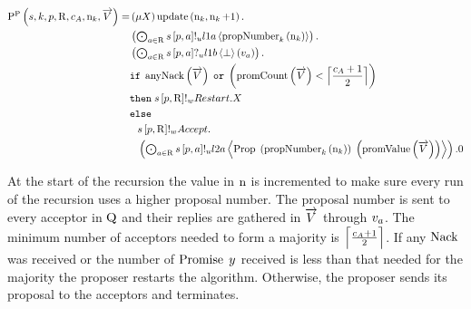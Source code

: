 \begin{align*}
\PpOne{
    \SessionChannel,
    \ProcessIndexK,
    \ProposerRole,
    \QRoles,
    \AcceptorCount,
    \NumberRegister_{\ProcessIndexK},
    \VectorV
} =
&
    \Mu{\RecursionVariable}
    \update{\NumberRegister_{\ProcessIndexK}}{\NumberRegister_{\ProcessIndexK} + 1} .\\
&
    \DotForall{
       \AcceptorRole \in \QRoles
    }{
        \SendUnreliableP{\SessionChannel}{\ProposerRole}{\AcceptorRole}{\LOneA}{\proposalNumber{\NumberRegister_{\ProcessIndexK}}{\ProcessIndexK}}
    }.\\
&
    \DotForall{
        \AcceptorRole \in \QRoles
    }{
        \ReceiveUnreliableP{\SessionChannel}{\ProposerRole}{\AcceptorRole}{\LOneB}{\bot}{v_{\AcceptorRole}}
    } .\\
&
    \If 
        \anyNack{\VectorV}
        \tOr
        \Paren{\promiseCount{\VectorV} < \ceil{\frac{\AcceptorCount + 1}{2}}}
    \\
&
    \Then \SendWeaklyP{\SessionChannel}{\ProposerRole}{\QRoles}{\Restart}.
    \RecursionVariable\\
&
    \Else\\
&\Indent{1}
    \SendWeaklyP{\SessionChannel}{\ProposerRole}{\QRoles}{\Accept}.\\
&\Indent{1}
    \DotForall{\AcceptorRole \in \QRoles}{
        \SendUnreliableP{\SessionChannel}{\ProposerRole}{\AcceptorRole}{\LTwoA}{
            \ProposalC{
                \Paren{\proposalNumber{\NumberRegister_{\ProcessIndexK}}{\ProcessIndexK}}
            }{
                \Paren{\promiseValue{\VectorV}}
            }
        }
    }
    .\End
\end{align*}

At the start of the recursion the value in $\operatorname{n}$ is incremented to make sure every run of the recursion uses a higher proposal number.
The proposal number is sent to every acceptor in $\operatorname{Q}$ and their replies are gathered in $\overrightarrow{V}$ through $v_{a}$.
The minimum number of acceptors needed to form a majority is $\Big\lceil \frac{c_A + 1}{2} \Big\rceil$.
If any $\operatorname{Nack}$ was received or the number of $\operatorname{Promise}\; y$ received is less than that needed for the majority the proposer restarts the algorithm.
Otherwise, the proposer sends its proposal to the acceptors and terminates.

